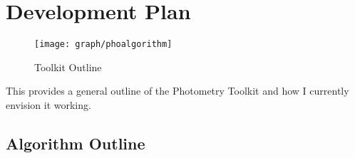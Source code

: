 \chapter{Development Plan}
\label{ch:developmentplan}

\begin{wrapfigure}{r}{0.3\textwidth}
  \vspace{-40pt}
  \begin{center}
    \texttt{[image: graph/phoalgorithm]}
  \end{center}
  \caption{Toolkit Outline}
  \vspace{-90pt}
\end{wrapfigure}

This provides a general outline of the Photometry Toolkit and how I
currently envision it working.

\section{Algorithm Outline}

